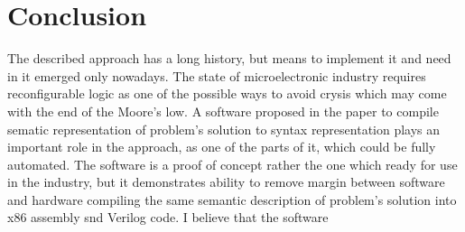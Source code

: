 \section{Conclusion}
The described approach has a long history, but means to implement it and need in it emerged only nowadays. The state of microelectronic industry requires reconfigurable logic as one of the possible ways to avoid crysis which may come with the end of the Moore's low. A software proposed in the paper to compile sematic representation of problem's solution to syntax representation plays an important role in the approach, as one of the parts of it, which could be fully automated. The software is a proof of concept rather the one which ready for use in the industry, but it demonstrates ability to remove margin between software and hardware compiling the same semantic description of problem's solution into x86 assembly snd Verilog code. I believe that the software
